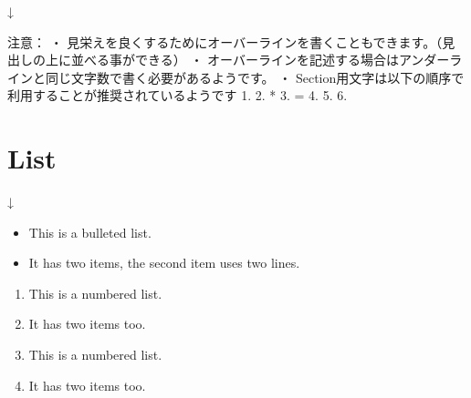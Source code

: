 \documentclass[letterpaper,10pt,dvipdfmx,openany,oneside]{sphinxmanual}
\begin{document}
↓

\noindent{}

\begin{sphinxVerbatim}[commandchars=\\\{\}]
注意：
・ 見栄えを良くするためにオーバーラインを書くこともできます。（見出しの上に並べる事ができる）
・ オーバーラインを記述する場合はアンダーラインと同じ文字数で書く必要があるようです。
・  Section用文字は以下の順序で利用することが推奨されているようです
  1. \PYGZsh{}
  2. *
  3. =
  4. \PYGZhy{}
  5. \PYGZca{}
  6. \PYGZdq{}
\end{sphinxVerbatim}


\section{List}
\label{\detokenize{1.chapter/basic_syntax:list}}
\begin{sphinxVerbatim}[commandchars=\\\{\}]
     
      
   

     
     

\end{sphinxVerbatim}

↓
\begin{itemize}
\item {} 
This is a bulleted list.

\item {} 
It has two items, the second
item uses two lines.

\end{itemize}
\begin{enumerate}
%
\item {} 
This is a numbered list.

\item {} 
It has two items too.

\item {} 
This is a numbered list.

\item {} 
It has two items too.

\end{enumerate}
\end{document}
